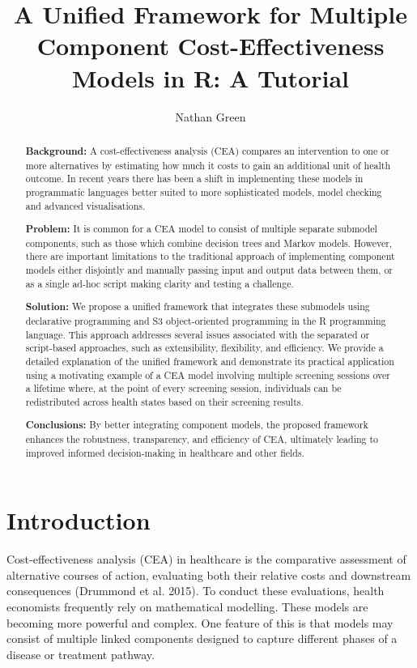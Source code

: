 \documentclass[
]{article}
\title{A Unified Framework for Multiple Component Cost-Effectiveness
Models in R: A Tutorial}
\author{Nathan Green}
\date{}
\begin{document}
\maketitle
\begin{abstract}
\textbf{Background:} A cost-effectiveness analysis (CEA) compares an
intervention to one or more alternatives by estimating how much it costs
to gain an additional unit of health outcome. In recent years there has
been a shift in implementing these models in programmatic languages
better suited to more sophisticated models, model checking and advanced
visualisations.

\textbf{Problem:} It is common for a CEA model to consist of multiple
separate submodel components, such as those which combine decision trees
and Markov models. However, there are important limitations to the
traditional approach of implementing component models either disjointly
and manually passing input and output data between them, or as a single
ad-hoc script making clarity and testing a challenge.

\textbf{Solution:} We propose a unified framework that integrates these
submodels using declarative programming and S3 object-oriented
programming in the R programming language. This approach addresses
several issues associated with the separated or script-based approaches,
such as extensibility, flexibility, and efficiency. We provide a
detailed explanation of the unified framework and demonstrate its
practical application using a motivating example of a CEA model
involving multiple screening sessions over a lifetime where, at the
point of every screening session, individuals can be redistributed
across health states based on their screening results.

\textbf{Conclusions:} By better integrating component models, the
proposed framework enhances the robustness, transparency, and efficiency
of CEA, ultimately leading to improved informed decision-making in
healthcare and other fields.
\end{abstract}


\section{Introduction}\label{introduction}

Cost-effectiveness analysis (CEA) in healthcare is the comparative
assessment of alternative courses of action, evaluating both their
relative costs and downstream consequences (Drummond et al. 2015). To
conduct these evaluations, health economists frequently rely on
mathematical modelling. These models are becoming more powerful and
complex. One feature of this is that models may consist of multiple
linked components designed to capture different phases of a disease or
treatment pathway.
\end{document}
